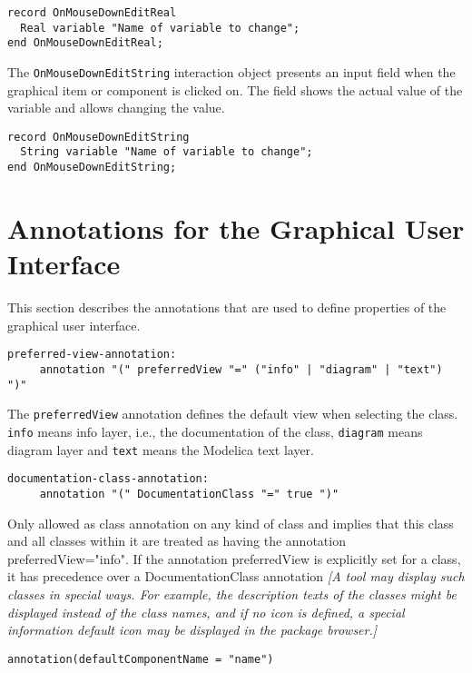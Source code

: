 \begin{lstlisting}[language=modelica]
record OnMouseDownEditReal
  Real variable "Name of variable to change";
end OnMouseDownEditReal;
\end{lstlisting}
The \lstinline!OnMouseDownEditString! interaction object presents an input field
when the graphical item or component is clicked on. The field shows the
actual value of the variable and allows changing the value.

\begin{lstlisting}[language=modelica]
record OnMouseDownEditString
  String variable "Name of variable to change";
end OnMouseDownEditString;
\end{lstlisting}
\section{Annotations for the Graphical User Interface}
This section describes the annotations that are used to define properties of the
graphical user interface.

\begin{lstlisting}[language=grammar]
  preferred-view-annotation:
     annotation "(" preferredView "=" ("info" | "diagram" | "text") ")"
\end{lstlisting}

The \lstinline!preferredView! annotation defines the default view when selecting the
class. \lstinline!info! means info layer, i.e., the documentation of the class,
\lstinline!diagram! means diagram layer and \lstinline!text! means the Modelica text layer.

\begin{lstlisting}[language=grammar]
  documentation-class-annotation:
     annotation "(" DocumentationClass "=" true ")"
\end{lstlisting}

Only allowed as class annotation on any kind of class and implies that
this class and all classes within it are treated as having the
annotation preferredView="info". If the annotation preferredView is
explicitly set for a class, it has precedence over a DocumentationClass
annotation \emph{{[}A tool may display such classes in special ways. For
example, the description texts of the classes might be displayed instead
of the class names, and if no icon is defined, a special information
default icon may be displayed in the package browser.{]}}

\begin{lstlisting}[language=modelica]
 annotation(defaultComponentName = "name")
\end{lstlisting}


